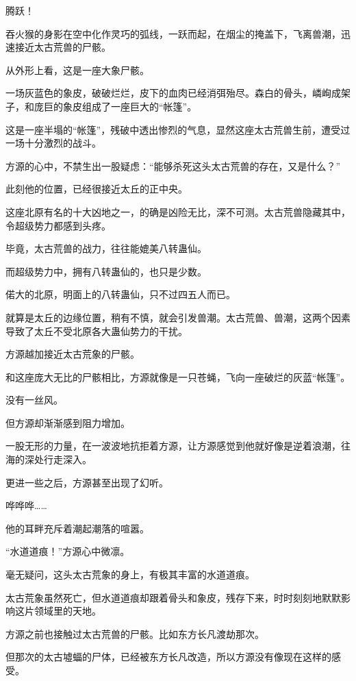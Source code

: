 
\begin{this_body}

腾跃！

吞火猴的身影在空中化作灵巧的弧线，一跃而起，在烟尘的掩盖下，飞离兽潮，迅速接近太古荒兽的尸骸。

从外形上看，这是一座大象尸骸。

一场灰蓝色的象皮，破破烂烂，皮下的血肉已经消弭殆尽。森白的骨头，嶙峋成架子，和庞巨的象皮组成了一座巨大的“帐篷”。

这是一座半塌的“帐篷”，残破中透出惨烈的气息，显然这座太古荒兽生前，遭受过一场十分激烈的战斗。

方源的心中，不禁生出一股疑虑：“能够杀死这头太古荒兽的存在，又是什么？”

此刻他的位置，已经很接近太丘的正中央。

这座北原有名的十大凶地之一，的确是凶险无比，深不可测。太古荒兽隐藏其中，令超级势力都感到头疼。

毕竟，太古荒兽的战力，往往能媲美八转蛊仙。

而超级势力中，拥有八转蛊仙的，也只是少数。

偌大的北原，明面上的八转蛊仙，只不过四五人而已。

就算是太丘的边缘位置，稍有不慎，就会引发兽潮。太古荒兽、兽潮，这两个因素导致了太丘不受北原各大蛊仙势力的干扰。

方源越加接近太古荒象的尸骸。

和这座庞大无比的尸骸相比，方源就像是一只苍蝇，飞向一座破烂的灰蓝“帐篷”。

没有一丝风。

但方源却渐渐感到阻力增加。

一股无形的力量，在一波波地抗拒着方源，让方源感觉到他就好像是逆着浪潮，往海的深处行走深入。

更进一些之后，方源甚至出现了幻听。

哗哗哗……

他的耳畔充斥着潮起潮落的喧嚣。

“水道道痕！”方源心中微凛。

毫无疑问，这头太古荒象的身上，有极其丰富的水道道痕。

太古荒象虽然死亡，但水道道痕却跟着骨头和象皮，残存下来，时时刻刻地默默影响这片领域里的天地。

方源之前也接触过太古荒兽的尸骸。比如东方长凡渡劫那次。

但那次的太古墟蝠的尸体，已经被东方长凡改造，所以方源没有像现在这样的感受。


\end{this_body}
